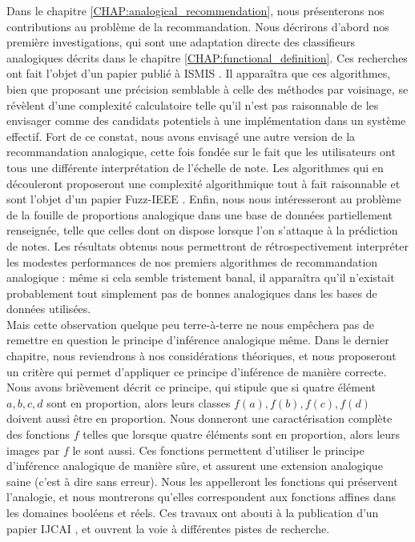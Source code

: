Dans le chapitre \ref{CHAP:analogical_recommendation}, nous présenterons nos
contributions au problème de la recommandation. Nous décrirons d'abord nos
première investigations, qui sont une adaptation directe des classifieurs
analogiques décrits dans le chapitre \ref{CHAP:functional_definition}. Ces
recherches ont fait l'objet d'un papier publié à ISMIS \cite{HugPraRicISMIS15}.
Il apparaîtra que ces algorithmes, bien que proposant une précision semblable à
celle des méthodes par voisinage, se révèlent d'une complexité calculatoire
telle qu'il n'est pas raisonnable de les envisager comme des candidats
potentiels à une implémentation dans un système effectif. Fort de ce constat,
nous avons envisagé une autre version de la recommandation analogique, cette fois
fondée sur le fait que les utilisateurs ont tous une différente interprétation
de l'échelle de note. Les algorithmes qui en découleront proposeront une
complexité algorithmique tout à fait raisonnable et sont l'objet d'un papier
Fuzz-IEEE  \cite{HugPraRicSerFuzzIEEE16}. Enfin, nous nous intéresseront au
problème de la fouille de proportions analogique dans une base de données
partiellement renseignée, telle que celles dont on dispose lorsque l'on
s'attaque à la prédiction de notes. Les résultats obtenus nous permettront de
rétrospectivement interpréter les modestes performances de nos premiers
algorithmes de recommandation analogique : même si cela semble tristement
banal, il apparaîtra qu'il n'existait probablement tout simplement pas de
bonnes analogiques dans les bases de données utilisées.\\


Mais cette observation quelque peu terre-à-terre ne nous empêchera pas de
remettre en question le principe d'inférence analogique même. Dans le dernier
chapitre, nous reviendrons à nos considérations théoriques, et nous proposeront
un critère qui permet d'appliquer ce principe d'inférence de manière correcte.
Nous avons brièvement décrit ce principe, qui stipule que si quatre élément $a,
b, c, d$ sont en proportion, alors leurs classes $f(a), f(b), f(c), f(d)$
doivent aussi être en proportion. Nous donneront une caractérisation complète
des fonctions $f$ telles que lorsque quatre éléments sont en proportion, alors
leurs images par $f$ le sont aussi. Ces fonctions permettent d'utiliser le
principe d'inférence analogique de manière sûre, et assurent une extension
analogique saine (c'est à dire sans erreur). Nous les appelleront les fonctions
qui préservent l'analogie, et nous montrerons qu'elles correspondent aux
fonctions affines dans les domaines booléens et réels. Ces travaux ont
abouti à la publication d'un papier IJCAI \cite{CouHugPraRicIJCAI17}, et
ouvrent la voie à différentes pistes de recherche.
